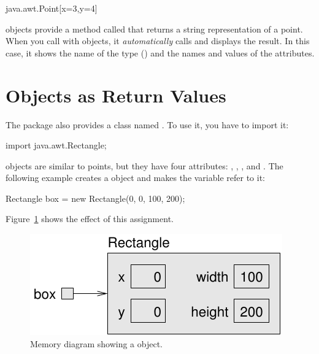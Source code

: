 \begin{stdout}
java.awt.Point[x=3,y=4]
\end{stdout}


 objects provide a method called  that returns a string representation of a point.
When you call  with objects, it {\em automatically} calls  and displays the result.
In this case, it shows the name of the type () and the names and values of the attributes.


\section{Objects as Return Values}
\label{sec:Rectangle}


The  package also provides a class named .
To use it, you have to import it:

\begin{code}
import java.awt.Rectangle;
\end{code}

 objects are similar to points, but they have four attributes: , , , and .
The following example creates a  object and makes the variable  refer to it:

\begin{code}
Rectangle box = new Rectangle(0, 0, 100, 200);
\end{code}

Figure~\ref{fig.rectangle} shows the effect of this assignment.

\begin{figure}[!ht]
\begin{center}
\includegraphics{figs/rectangle.pdf}
\caption{Memory diagram showing a  object.}
\label{fig.rectangle}
\end{center}
\end{figure}

